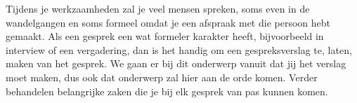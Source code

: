 
Tijdens je werkzaamheden zal je veel mensen spreken, soms even in de wandelgangen en soms formeel omdat je een afspraak met die persoon hebt gemaakt. Als een gesprek een wat formeler karakter heeft, bijvoorbeeld in interview of een vergadering, dan is het handig om een gespreksverslag te, laten, maken van het gesprek. We gaan er bij dit onderwerp vanuit dat jij het verslag moet maken, dus ook dat onderwerp zal hier aan de orde komen. Verder behandelen belangrijke zaken die je bij elk gesprek van pas kunnen komen.
